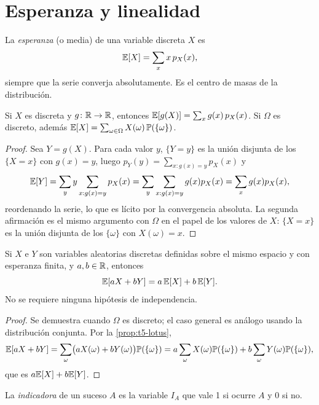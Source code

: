 \section{Esperanza y linealidad}

\begin{definicion}[Esperanza]
La \emph{esperanza} (o media) de una variable discreta $X$ es
\[
\mathbb{E}[X]=\sum_{x}x\,p_X(x),
\]
siempre que la serie converja absolutamente. Es el centro de masas de la distribución.
\end{definicion}

\begin{proposicion}\label{prop:t5-lotus}
Si $X$ es discreta y $g\colon\mathbb{R}\to\mathbb{R}$, entonces $\mathbb{E}[g(X)]=\sum_xg(x)\,p_X(x)$. Si $\Omega$ es discreto, además $\mathbb{E}[X]=\sum_{\omega\in\Omega}X(\omega)\,\mathbb{P}(\{\omega\})$.
\end{proposicion}

\begin{proof}
Sea $Y=g(X)$. Para cada valor $y$, $\{Y=y\}$ es la unión disjunta de los $\{X=x\}$ con $g(x)=y$, luego $p_Y(y)=\sum_{x:g(x)=y}p_X(x)$ y
\[
\mathbb{E}[Y]=\sum_yy\sum_{x:g(x)=y}p_X(x)=\sum_y\sum_{x:g(x)=y}g(x)p_X(x)=\sum_xg(x)p_X(x),
\]
reordenando la serie, lo que es lícito por la convergencia absoluta. La segunda afirmación es el mismo argumento con $\Omega$ en el papel de los valores de $X$: $\{X=x\}$ es la unión disjunta de los $\{\omega\}$ con $X(\omega)=x$.
\end{proof}

\begin{teorema}\label{teo:t5-linealidad}
Si $X$ e $Y$ son variables aleatorias discretas definidas sobre el mismo espacio y con esperanza finita, y $a,b\in\mathbb{R}$, entonces
\[
\mathbb{E}[aX+bY]=a\,\mathbb{E}[X]+b\,\mathbb{E}[Y].
\]
No se requiere ninguna hipótesis de independencia.
\end{teorema}

\begin{proof}
Se demuestra cuando $\Omega$ es discreto; el caso general es análogo usando la distribución conjunta. Por la \cref{prop:t5-lotus},
\[
\mathbb{E}[aX+bY]=\sum_{\omega}\bigl(aX(\omega)+bY(\omega)\bigr)\mathbb{P}(\{\omega\})=a\sum_\omega X(\omega)\mathbb{P}(\{\omega\})+b\sum_\omega Y(\omega)\mathbb{P}(\{\omega\}),
\]
que es $a\mathbb{E}[X]+b\mathbb{E}[Y]$.
\end{proof}

\begin{definicion}
La \emph{indicadora} de un suceso $A$ es la variable $I_A$ que vale 1 si ocurre $A$ y 0 si no.
\end{definicion}

